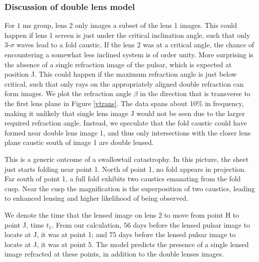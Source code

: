 \documentclass[useAMS,usenatbib]{mn2e}
\begin{document}

\subsubsection{Discussion of double lens model}
For $1$ ms group, lens 2
only images a subset of the lens 1 images.  This could happen if
lens 1 screen is just under the critical inclination
angle, such that only 3-$\sigma$ waves lead to a fold caustic.  If the lens 2 was at a critical angle, the chance of encountering a
somewhat less inclined system is of order unity.
More surprising is the absence of a single refraction
image of the pulsar, which is expected at position J.  This could
happen if the maximum refraction angle is just below critical, such
that only rays on the appropriately aligned double refraction can form
images.  
We plot the refraction angle $\beta$ in the
direction that is transverse to the first lens plane in Figure
\ref{vtrans}. The data
spans about 10\% in frequency, making it unlikely that single lens
image J would not be seen due to the larger required refraction
angle.  Instead, we speculate that the fold caustic could have formed
near double lens image 1, and thus only intersections with the closer
lens plane caustic south of image 1 are double lensed.

This is a generic outcome of a swallowtail
catastrophy\citep{Arnold1990}.   In this picture, the sheet just
starts folding near point 1.  North of point 1, no fold appears in
projection.  Far south of point 1, a full fold exhibits two caustics
emanating from the fold cusp.  Near the cusp the magnification is the
superposition of two caustics, leading to enhanced lensing and higher
likelihood of being observed.

We denote the time that the lensed image on lens 2 to move from point
H to point J, time $t_1$. From our calculation, $56$ days before the
lensed pulsar image to locate at J, it was at point 1; and $75$ days
before the lensed pulsar image to locate at J, it was at point 5. The
model predicts the presence of a single lensed image refracted at
these points, in addition to the double lenses images.
\end{document}
